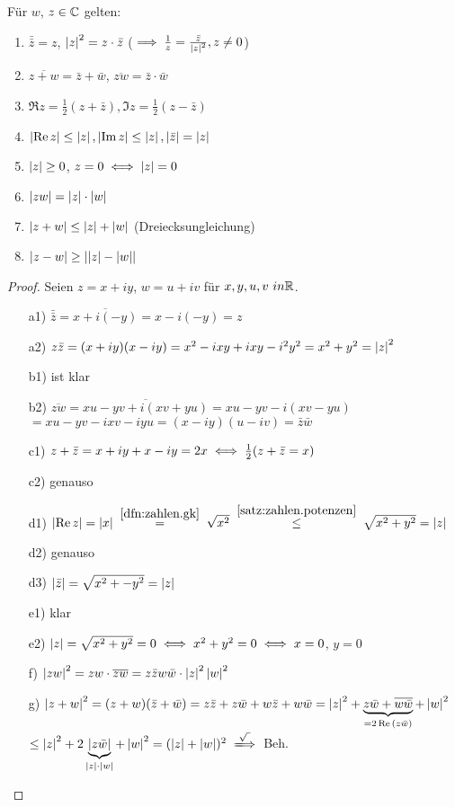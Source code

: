 \documentclass[12pt]{scrreprt}
\begin{document}
\begin{satz}\label{satz:zahlen.kreg}
Für $w$, $z \in \mathbb{C}$ gelten:
\begin{enumerate}
\item \label{satz:zahlen.kreg.a}
$\bar{\bar{z}} = z$, $\left\lvert z\right\lvert^2 = z \cdot \bar{z}$ ($\implies \frac{1}{z} = \frac{\bar{z}}{\left\lvert z\right\lvert^2}, z \ne 0$)
\item \label{satz:zahlen.kreg.b}
$\overline{z+w} = \bar{z} + \bar{w}$, $\overline{zw} = \bar{z} \cdot \bar{w}$
\item \label{satz:zahlen.kreg.c}
$\Re{z} = \frac{1}{2}(z + \bar{z}), \Im{z} = \frac{1}{2}(z-\bar{z})$
\item \label{satz:zahlen.kreg.d}
$\left\lvert\operatorname{Re}{z}\right\lvert \le \left\lvert z\right\lvert, \left\lvert\operatorname{Im}{z}\right\lvert \le \left\lvert z\right\lvert, \left\lvert\bar{z}\right\lvert = \left\lvert z\right\lvert$
\item \label{satz:zahlen.kreg.e}
$\left\lvert z\right\lvert \ge 0$, $z = 0 \iff \left\lvert z\right\lvert = 0$ 
\item \label{satz:zahlen.kreg.f}
$\left\lvert zw\right\lvert = \left\lvert z\right\lvert \cdot \left\lvert w\right\lvert$
\item \label{satz:zahlen.kreg.g}
$\left\lvert z+w\right\lvert \le \left\lvert z\right\lvert + \left\lvert w\right\lvert$ (Dreiecksungleichung)
\item \label{satz:zahlen.kreg.h}
$\left\lvert z-w\right\lvert\ge \left\lvert\left\lvert z\right\lvert - \left\lvert w\right\lvert\right\lvert$
\end{enumerate}
\end{satz}
\begin{proof}
Seien $z = x+iy$, $w = u+iv$ für $x,y,u,v \ in \mathbb{R}$.
\begin{enumerate}
\item[a1)]
$\bar{\bar{z}} = \overline{x+i(-y)} = x - i(-y) = z$
\item[a2)]
$z\bar{z} = (x+iy)(x-iy) = x^2 - ixy + ixy - i^2y^2 = x^2 +y^2 = \left\lvert z\right\lvert^2$
\item[b1)]
ist klar
\item[b2)]
$\overline{zw} = \overline{xu - yv + i(xv+yu)} = xu-yv-i(xv-yu)$
$= xu - yv - ixv -iyu = (x-iy)(u-iv) = \bar{z}\bar{w}$
\item[c1)]
$z + \bar{z} = x+ iy + x - iy = 2x \iff \frac{1}{2}(z + \bar{z} = x)$
\item[c2)]
genauso
\item[d1)]
$\abs{\Re{z}} = \abs{x} \wegen{=}{\ref{dfn:zahlen.gk}} \sqrt{x^2} \wegen{\le}{\ref{satz:zahlen.potenzen}} \sqrt{x^2 +y^2} = \abs{z}$
\item[d2)]
genauso
\item[d3)]
$\left\lvert\bar{z}\right\lvert = \sqrt{x^2 + {-y}^2} = \left\lvert z\right\lvert$
\item[e1)]
klar
\item[e2)]
$\left\lvert z\right\lvert = \sqrt{x^2+y^2} = 0 \iff x^2 +y^2 = 0 \iff x=0$, $y=0$
\item[f)]
$\left\lvert zw\right\lvert^2 = zw \cdot \overline{zw} = z\bar{z}w\bar{w} \cdot \left\lvert z\right\lvert^2 \left\lvert w\right\lvert^2$
\item[g)]
$\left\lvert z+w\right\lvert^2 = (z+w)(\bar{z}+\bar{w}) = z\bar{z} + z\bar{w} + w\bar{z} + w\bar{w} = 
\left\lvert z\right\lvert^2 + \underbrace{z\bar{w} + \overline{w\bar{w}}}_{=2\operatorname{Re}{(z\bar{w})}} + \left\lvert w\right\lvert^2$
$\le \abs{z}^2 + 2\underbrace{\abs{z\bar{w}}}_{\abs{z}\cdot\abs{w}} + \abs{w}^2 = (\abs{z} +\abs{w})^2 \folgtwegen{\sqrt{\,\,}}$ Beh.
\end{enumerate}
\end{proof}
\end{document}
